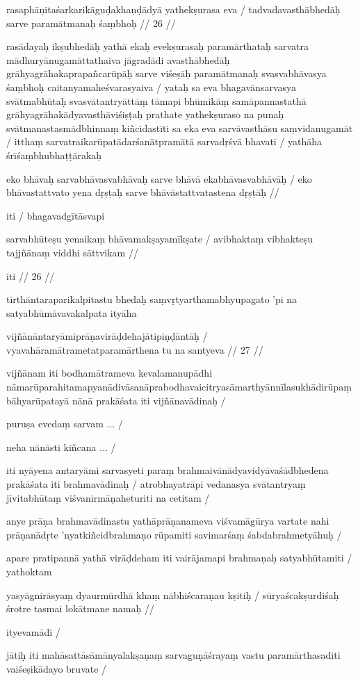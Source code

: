 rasaphāṇitaśarkarikāguḍakhaṇḍādyā yathekṣurasa eva  /
tadvadavasthābhedāḥ sarve paramātmanaḥ śaṃbhoḥ  // 26  //

rasādayaḥ ikṣubhedāḥ yathā ekaḥ evekṣurasaḥ paramārthataḥ sarvatra mādhuryānugamāttathaiva jāgradādi avasthābhedāḥ grāhyagrāhakaprapañcarūpāḥ sarve viśeṣāḥ paramātmanaḥ svasvabhāvasya śaṃbhoḥ caitanyamaheśvarasyaiva  / yataḥ sa eva bhagavānsarvasya svātmabhūtaḥ svasvātantryāttāṃ tāmapi bhūmikāṃ samāpannastathā grāhyagrāhakādyavasthāviśiṣṭaḥ prathate yathekṣuraso na punaḥ svātmanastasmādbhinnaṃ kiñcidastīti sa eka eva sarvāvasthāsu saṃvidanugamāt  / itthaṃ sarvatraikarūpatādarśanātpramātā sarvadṛśvā bhavati  / yathāha śrīśaṃbhubhaṭṭārakaḥ

eko bhāvaḥ sarvabhāvasvabhāvaḥ sarve bhāvā ekabhāvasvabhāvāḥ  /
eko bhāvastattvato yena dṛṣṭaḥ sarve bhāvāstattvatastena dṛṣṭāḥ  //

iti  / bhagavadgītāsvapi

sarvabhūteṣu yenaikaṃ bhāvamakṣayamīkṣate  /
avibhaktaṃ vibhakteṣu tajjñānaṃ viddhi sāttvikam  //

iti  // 26  //

tīrthāntaraparikalpitastu bhedaḥ saṃvṛtyarthamabhyupagato 'pi na satyabhūmāvavakalpata ityāha

vijñānāntaryāmiprāṇavirāḍdehajātipiṇḍāntāḥ  /
vyavahāramātrametatparamārthena tu na santyeva  // 27  //

vijñānam iti bodhamātrameva kevalamanupādhi nāmarūparahitamapyanādivāsanāprabodhavaicitryasāmarthyānnīlasukhādirūpaṃ bāhyarūpatayā nānā prakāśata iti vijñānavādinaḥ  /

puruṣa evedaṃ sarvam  ...  /

neha nānāsti kiñcana  ...  /

iti nyāyena antaryāmi sarvasyeti paraṃ brahmaivānādyavidyāvaśādbhedena prakāśata iti brahmavādinaḥ  / atrobhayatrāpi vedanasya svātantryaṃ jīvitabhūtaṃ viśvanirmāṇaheturiti na cetitam  /

anye prāṇa brahmavādinastu yathāprāṇanameva viśvamāgūrya vartate nahi prāṇanādṛte 'nyatkiñcidbrahmaṇo rūpamiti savimarśaṃ śabdabrahmetyāhuḥ  /

apare pratipannā yathā virāḍdeham iti vairājamapi brahmaṇaḥ satyabhūtamiti  / yathoktam

yasyāgnirāsyaṃ dyaurmūrdhā khaṃ nābhiścaraṇau kṣitiḥ  /
sūryaścakṣurdiśaḥ śrotre tasmai lokātmane namaḥ  //

ityevamādi  /

jātiḥ iti mahāsattāsāmānyalakṣaṇaṃ sarvaguṇāśrayaṃ vastu paramārthasaditi vaiśeṣikādayo bruvate  /

